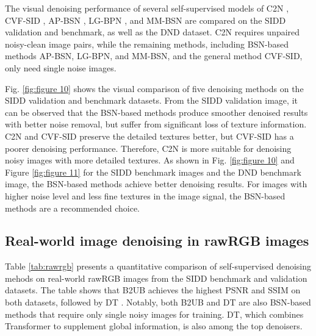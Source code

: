 \documentclass[conference]{IEEEtran}
\begin{document}
The visual denoising performance of several self-supervised models of C2N \cite{jang2021c2n}, CVF-SID \cite{neshatavar2022cvf}, AP-BSN \cite{lee2022ap}, LG-BPN \cite{wang2023lg}, and MM-BSN \cite{zhang2023mm} are compared on the SIDD validation and benchmark, as well as the DND dataset. C2N requires unpaired noisy-clean image pairs, while the remaining methods, including BSN-based methods AP-BSN, LG-BPN, and MM-BSN, and the general method CVF-SID, only need single noise images.

Fig. \ref{fig:figure 10} shows the visual comparison of five denoising methods on the SIDD\cite{abdelhamed2018high} validation and benchmark datasets. From the SIDD validation image, it can be observed that the BSN-based methods produce smoother denoised results with better noise removal, but suffer from significant loss of texture information. C2N \cite{jang2021c2n} and CVF-SID \cite{neshatavar2022cvf} preserve the detailed textures better, but CVF-SID has a poorer denoising performance. Therefore, C2N is more suitable for denoising noisy images with more detailed textures.
As shown in Fig. \ref{fig:figure 10} and Figure \ref{fig:figure 11} for the SIDD benchmark images and the DND benchmark image, the BSN-based methods achieve better denoising results. For images with higher noise level and less fine textures in the image signal, the BSN-based methods are a recommended choice.

\subsection{Real-world image denoising in rawRGB images}

Table \ref{tab:rawrgb} presents a quantitative comparison of self-supervised denoising mehods on real-world rawRGB images from the SIDD\cite{abdelhamed2018high} benchmark and validation datasets. The table shows that B2UB \cite{wang2022blind2unblind} achieves the highest PSNR and SSIM on both datasets, followed by DT \cite{zhang2023self}. Notably, both B2UB and DT are also BSN-based methods that require only single noisy images for training. DT, which combines Transformer to supplement global information, is also among the top denoisers.
\end{document}

